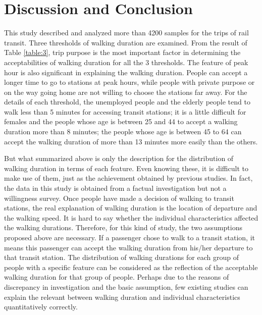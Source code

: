 \documentclass[Journal,letterpaper]{ascelike-new}
\begin{document}
\section{Discussion and Conclusion}
This study described and analyzed more than 4200 samples for the trips of rail transit. Three thresholds of walking duration are examined. From the result of Table \ref{table:3}, trip purpose is the most important factor in determining the acceptabilities of walking duration for all the 3 thresholds. The feature of peak hour is also significant in explaining the walking duration. People can accept a longer time to go to stations at peak hours, while people with private purpose or on the way going home are not willing to choose the stations far away. For the details of each threshold, the unemployed people and the elderly people tend to walk less than 5 minutes for accessing transit stations; it is a little difficult for females and the people whose age is between 25 and 44 to accept a walking duration more than 8 minutes; the people whose age is between 45 to 64 can accept the walking duration of more than 13 minutes more easily than the others.

%
But what summarized above is only the description for the distribution of walking duration in terms of each feature. Even knowing these, it is difficult to make use of them, just as the achievement obtained by previous studies. In fact, the data in this study is obtained from a factual investigation but not a willingness survey. Once people have made a decision of walking to transit stations, the real explanation of walking duration is the location of departure and the walking speed. It is hard to say whether the individual characteristics affected the walking durations. Therefore, for this kind of study, the two assumptions proposed above are necessary. If a passenger chose to walk to a transit station, it means this passenger can accept the walking duration from his/her departure to that transit station. The distribution of walking durations for each group of people with a specific feature can be considered as the reflection of the acceptable walking duration for that group of people. Perhaps due to the reasons of discrepancy in investigation and the basic assumption, few existing studies can explain the relevant between walking duration and individual characteristics quantitatively correctly.
\end{document}
